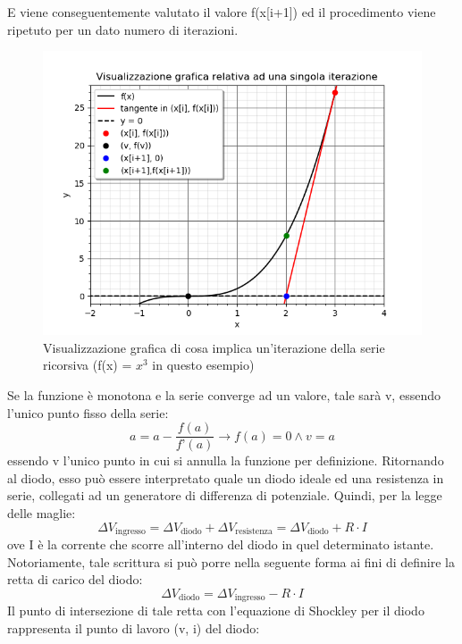 \documentclass{article}[a4paper, oneside, 11pt]
\begin{document}
E viene conseguentemente valutato il valore f(x[i+1]) ed il procedimento viene ripetuto per un dato numero di iterazioni. 
\begin{figure}[H]
	\centering 
 		\includegraphics[scale=0.75]{./Figura1_appendiceB.png}
	\caption{Visualizzazione grafica di cosa implica un’iterazione della serie ricorsiva (f(x) = $x^3$ in questo esempio)}
\end{figure}
Se la funzione è monotona e la serie converge ad un valore, tale sarà v, essendo l’unico punto fisso della serie:
\begin{equation}
 {a = a -  {\frac{f(a)}{f{’}(a)}}}\to{{f(a) = 0}\land{v = a}}
\end{equation}
essendo v l’unico punto in cui si annulla la funzione per definizione.
Ritornando al diodo, esso può essere interpretato quale un diodo ideale ed una resistenza in serie, collegati ad un generatore di differenza di potenziale. Quindi, per la legge delle maglie:
\begin{equation}
\Delta V_{\text{ingresso}} = \Delta V_{\text{diodo}} + \Delta V_{\text{resistenza}} = \Delta V_{\text{diodo}} + R \cdot I
\end{equation}
ove I è la corrente che scorre all’interno del diodo in quel determinato istante. Notoriamente, tale scrittura si può porre nella seguente forma ai fini di definire la retta di carico del diodo:
\begin{equation}
\Delta V_{\text{diodo}} = \Delta V_{\text{ingresso}} - R \cdot I
\end{equation}
Il punto di intersezione di tale retta con l’equazione di Shockley per il diodo rappresenta il punto di lavoro (v, i) del diodo:
\end{document}
